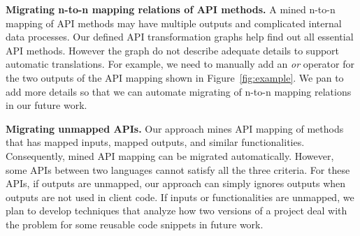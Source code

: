 \textbf{Migrating n-to-n mapping relations of API methods.} A mined
n-to-n mapping of API methods may have multiple outputs and
complicated internal data processes. Our defined API transformation
graphs help find out all essential API methods. However the graph do
not describe adequate details to support automatic translations. For
example, we need to manually add an \emph{or} operator for the two
outputs of the API mapping shown in Figure~\ref{fig:example}. We pan
to add more details so that we can automate migrating of n-to-n
mapping relations in our future work.

\textbf{Migrating unmapped APIs.} Our approach mines API mapping of
methods that has mapped inputs, mapped outputs, and similar
functionalities. Consequently, mined API mapping can be migrated
automatically. However, some APIs between two languages cannot
satisfy all the three criteria. For these APIs, if outputs are
unmapped, our approach can simply ignores outputs when outputs are
not used in client code. If inputs or functionalities are unmapped,
we plan to develop techniques that analyze how two versions of a
project deal with the problem for some reusable code snippets in
future work.
